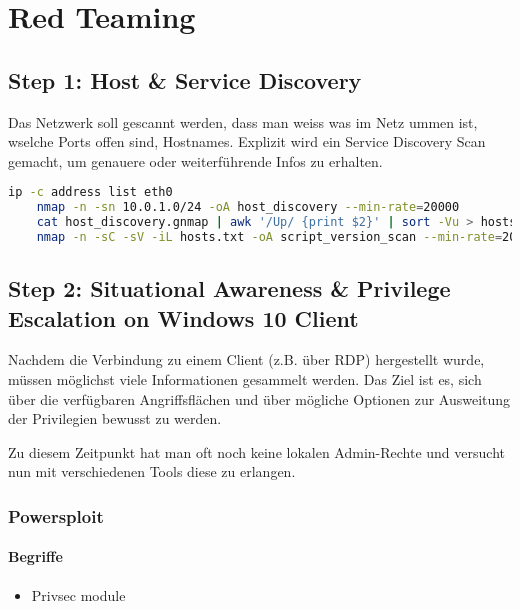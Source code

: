 

\section{Red Teaming}

\subsection{Step 1: Host \& Service Discovery}
Das Netzwerk soll gescannt werden, dass man weiss was im Netz ummen ist, wselche Ports offen sind, Hostnames.
Explizit wird ein Service Discovery Scan gemacht, um genauere oder weiterführende Infos zu erhalten. 

\begin{lstlisting}[language=bash]
    ip -c address list eth0
    nmap -n -sn 10.0.1.0/24 -oA host_discovery --min-rate=20000
    cat host_discovery.gnmap | awk '/Up/ {print $2}' | sort -Vu > hosts.txt
    nmap -n -sC -sV -iL hosts.txt -oA script_version_scan --min-rate=20000
\end{lstlisting}

\subsection{Step 2: Situational Awareness \& Privilege Escalation on Windows 10 Client}
Nachdem die Verbindung zu einem Client (z.B. über RDP) hergestellt wurde, müssen möglichst viele Informationen gesammelt werden. Das Ziel ist es, sich über die verfügbaren Angriffsflächen und über mögliche Optionen zur Ausweitung der Privilegien bewusst zu werden.

Zu diesem Zeitpunkt hat man oft noch keine lokalen Admin-Rechte und versucht nun mit verschiedenen Tools diese zu erlangen.

\subsubsection{Powersploit}

\paragraph{Begriffe}

\begin{itemize}
    \item Privsec module
\end{itemize}

